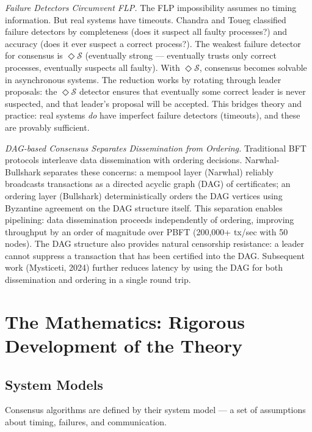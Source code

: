 \emph{Failure Detectors Circumvent FLP.}
The FLP impossibility assumes no timing information. But real systems have timeouts. Chandra and Toueg classified failure detectors by completeness (does it suspect all faulty processes?) and accuracy (does it ever suspect a correct process?). The weakest failure detector for consensus is $\Diamond \mathcal{S}$ (eventually strong — eventually trusts only correct processes, eventually suspects all faulty). With $\Diamond \mathcal{S}$, consensus becomes solvable in asynchronous systems. The reduction works by rotating through leader proposals: the $\Diamond \mathcal{S}$ detector ensures that eventually some correct leader is never suspected, and that leader's proposal will be accepted. This bridges theory and practice: real systems \emph{do} have imperfect failure detectors (timeouts), and these are provably sufficient.

\emph{DAG-based Consensus Separates Dissemination from Ordering.}
Traditional BFT protocols interleave data dissemination with ordering decisions. Narwhal-Bullshark separates these concerns: a mempool layer (Narwhal) reliably broadcasts transactions as a directed acyclic graph (DAG) of certificates; an ordering layer (Bullshark) deterministically orders the DAG vertices using Byzantine agreement on the DAG structure itself. This separation enables pipelining: data dissemination proceeds independently of ordering, improving throughput by an order of magnitude over PBFT (200,000+ tx/sec with 50 nodes). The DAG structure also provides natural censorship resistance: a leader cannot suppress a transaction that has been certified into the DAG. Subsequent work (Mysticeti, 2024) further reduces latency by using the DAG for both dissemination and ordering in a single round trip.

\section{The Mathematics: Rigorous Development of the Theory}
\label{sec:consensus:math}

\subsection{System Models}
\label{sec:consensus:models}

Consensus algorithms are defined by their system model — a set of assumptions about timing, failures, and communication.

